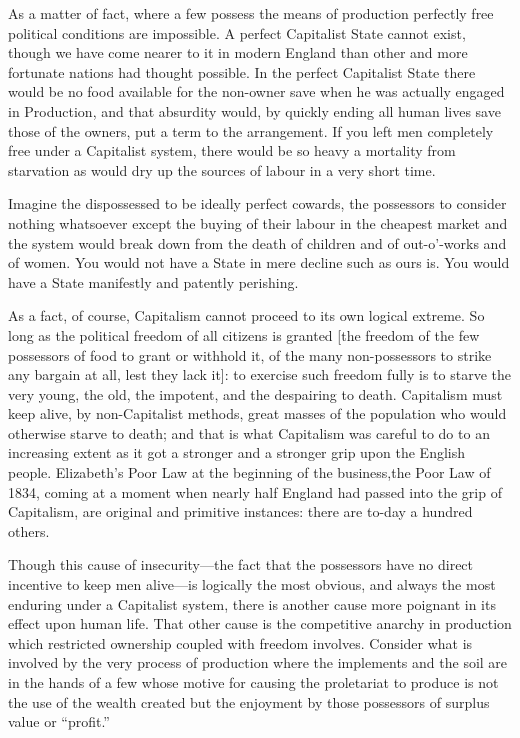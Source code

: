 \documentclass{book}
\begin{document}
As a matter of fact, where a few possess the means of production perfectly free political conditions are impossible. A perfect Capitalist State cannot exist, though we have come nearer to it in modern England than other and more fortunate nations had thought possible. In the perfect Capitalist State there would be no food available for the non-owner save when he was actually engaged in Production, and that absurdity would, by quickly ending all human lives save those of the owners, put a term to the arrangement. If you left men completely free under a Capitalist system, there would be so heavy a mortality from starvation as would dry up the sources of labour in a very short time.

Imagine the dispossessed to be ideally perfect cowards, the possessors to consider nothing whatsoever except the buying of their labour in the cheapest market and the system would break down from the death of children and of out-o’-works and of women. You would not have a State in mere decline such as ours is. You would have a State manifestly and patently perishing.

As a fact, of course, Capitalism cannot proceed to its own logical extreme. So long as the political freedom of all citizens is granted {[}the freedom of the few possessors of food to grant or withhold it, of the many non-possessors to strike any bargain at all, lest they lack it{]}: to exercise such freedom fully is to starve the very young, the old, the impotent, and the despairing to death. Capitalism must keep alive, by non-Capitalist methods, great masses of the population who would otherwise starve to death; and that is what Capitalism was careful to do to an increasing extent as it got a stronger and a stronger grip upon the English people. Elizabeth’s Poor Law at the beginning of the business,the Poor Law of 1834, coming at a moment when nearly half England had passed into the grip of Capitalism, are original and primitive instances: there are to-day a hundred others.

Though this cause of insecurity—the fact that the possessors have no direct incentive to keep men alive—is logically the most obvious, and always the most enduring under a Capitalist system, there is another cause more poignant in its effect upon human life. That other cause is the competitive anarchy in production which restricted ownership coupled with freedom involves. Consider what is involved by the very process of production where the implements and the soil are in the hands of a few whose motive for causing the proletariat to produce is not the use of the wealth created but the enjoyment by those possessors of surplus value or “profit.”
\end{document}
